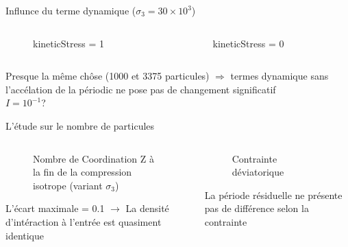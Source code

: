 \documentclass[10pt]{beamer}
\begin{document}
\begin{frame}{Influnce du terme dynamique ($\sigma_3 = 30 \times 10^3$)}
    \begin{columns}
        \begin{column}{0.5\textwidth}
            \begin{figure}
                \centering
                \scalebox{0.5}{}
                \caption{kineticStress = 1}
            \end{figure}
        \end{column}
        \begin{column}{0.5\textwidth}
            \begin{figure}
                \centering
                \scalebox{0.5}{}
                \caption{kineticStress = 0}
            \end{figure}
        \end{column}
    \end{columns}
    Presque la même chôse (1000 et 3375 particules) $\Rightarrow$ termes dynamique sans l'accélation de la périodic ne pose pas de changement significatif\\
    $I = 10^{-1}$?
\end{frame}

\begin{frame}{L'étude sur le nombre de particules}
    \begin{columns}
        \begin{column}{0.5\textwidth}
            \begin{figure}
                \centering
                \scalebox{0.5}{}
                \caption{Nombre de Coordination Z à la fin de la compression isotrope (variant $\sigma_3$)}
            \end{figure}
            L'écart maximale = 0.1 $\rightarrow$ La densité d'intéraction à l'entrée est quasiment identique
        \end{column}
        \begin{column}{0.5\textwidth}
            \begin{figure}
                \centering
                \scalebox{0.5}{}
                \caption{Contrainte déviatorique}
            \end{figure}
                La période résiduelle ne présente pas de différence selon la contrainte
        \end{column}
    \end{columns}

\end{frame}
\end{document}
